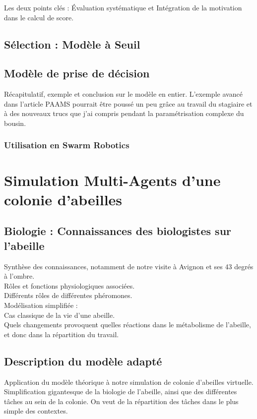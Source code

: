 \documentclass[10pt,a4paper]{article}
\begin{document}
			
			
			Les deux points clés : Évaluation systématique et Intégration de la motivation dans le calcul de score.
	\subsection{Sélection : Modèle à Seuil}
		
	\subsection{Modèle de prise de décision}
		Récapitulatif, exemple et conclusion sur le modèle en entier.
		L'exemple avancé dans l'article PAAMS pourrait être poussé un peu grâce au travail du stagiaire et à des nouveaux trucs que j'ai compris pendant la paramétrisation complexe du bousin.
		\subsubsection{Utilisation en Swarm Robotics}
			
\section{Simulation Multi-Agents d'une colonie d'abeilles}
	\subsection{Biologie : Connaissances des biologistes sur l'abeille}
		Synthèse des connaissances, notamment de notre visite à Avignon et ses 43 degrés à l'ombre.\\
		
		Rôles et fonctions physiologiques associées.\\
		Différents rôles de différentes phéromones.\\
		Modélisation simplifiée : \\
		Cas classique de la vie d'une abeille.\\
		Quels changements provoquent quelles réactions dans le métabolisme de l'abeille, et donc dans la répartition du travail.
	\subsection{Description du modèle adapté}
		Application du modèle théorique à notre simulation de colonie d'abeilles virtuelle.
		Simplification gigantesque de la biologie de l'abeille, ainsi que des différentes tâches au sein de la colonie.
		On veut de la répartition des tâches dans le plus simple des contextes.
\end{document}
